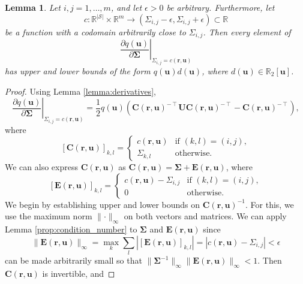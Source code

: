 \documentclass{article}
\newtheorem{lemma}[theorem]{Lemma}
\theoremstyle{definition}
\theoremstyle{remark}
\begin{document}
\begin{lemma} \label{lemma:bound3}
  Let $i, j = 1, \dots, m$, and let $\epsilon > 0$ be arbitrary. Furthermore,
  let
  \[
    c : \mathbb{R}^{|\mathcal{S}|} \times \mathbb{R}^m \to (\Sigma_{i,j} - \epsilon,
    \Sigma_{i,j} + \epsilon) \subset \mathbb{R}
  \]
  be a function with a codomain arbitrarily close to $\Sigma_{i,j}$. Then every
  element of
  \[
    \left. \frac{\partial q(\mathbf{u})}{\partial \bm\Sigma} \right|_{\Sigma_{i,j} =
    c(\mathbf{r}, \mathbf{u})}
  \]
  has upper and lower bounds of the form $q(\mathbf{u})d(\mathbf{u})$, where
  $d(\mathbf{u}) \in \mathbb{R}_2[\mathbf{u}]$.
\end{lemma}
\begin{proof}
  Using Lemma \ref{lemma:derivatives},
  \[
    \left. \frac{\partial q(\mathbf{u})}{\partial \bm\Sigma} \right|_{\Sigma_{i,j} =
    c(\mathbf{r}, \mathbf{u})} =
    \frac{1}{2}q(\mathbf{u})(\mathbf{C}(\mathbf{r},
    \mathbf{u})^{-\intercal}\mathbf{UC}(\mathbf{r}, \mathbf{u})^{-\intercal} -
    \mathbf{C}(\mathbf{r}, \mathbf{u})^{-\intercal}),
  \]
  where
  \[
    [\mathbf{C}(\mathbf{r}, \mathbf{u})]_{k,l} =
    \begin{cases}
      c(\mathbf{r}, \mathbf{u}) & \text{if } (k, l) = (i, j), \\
      \Sigma_{k,l} & \text{otherwise.}
    \end{cases}
  \]
  We can also express $\mathbf{C}(\mathbf{r},\mathbf{u})$ as
  $\mathbf{C}(\mathbf{r}, \mathbf{u}) = \bm\Sigma + \mathbf{E}(\mathbf{r},
  \mathbf{u})$, where
  \[
    [\mathbf{E}(\mathbf{r}, \mathbf{u})]_{k,l} =
    \begin{cases}
      c(\mathbf{r}, \mathbf{u}) - \Sigma_{i,j} & \text{if } (k, l) = (i, j), \\
      0 & \text{otherwise.}
    \end{cases}
  \]
  We begin by establishing upper and lower bounds on $\mathbf{C}(\mathbf{r},
  \mathbf{u})^{-1}$. For this, we use the maximum norm $\lVert \cdot
  \rVert_\infty$ on both vectors and matrices. We can apply Lemma
  \ref{prop:condition_number} to $\bm\Sigma$ and $\mathbf{E}(\mathbf{r},
  \mathbf{u})$ since
  \[
    \lVert \mathbf{E}(\mathbf{r}, \mathbf{u}) \rVert_\infty = \max_k \sum_l
    |[\mathbf{E}(\mathbf{r}, \mathbf{u})]_{k,l}| = |c(\mathbf{r}, \mathbf{u}) -
    \Sigma_{i,j}| < \epsilon
  \]
  can be made arbitrarily small so that $\lVert \bm\Sigma^{-1} \rVert_\infty
  \lVert \mathbf{E}(\mathbf{r}, \mathbf{u}) \rVert_\infty < 1$. Then
  $\mathbf{C}(\mathbf{r}, \mathbf{u})$ is invertible, and

\end{proof}
\end{document}
